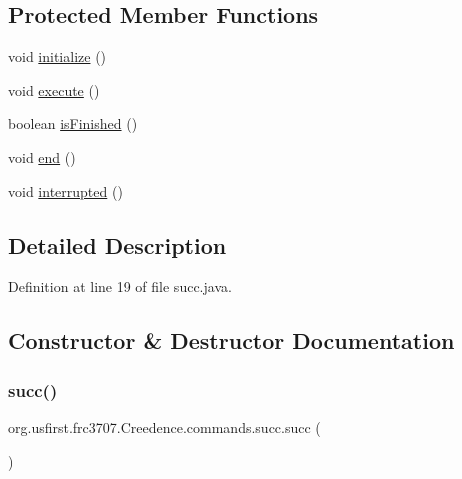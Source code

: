 \subsection*{Protected Member Functions}
\begin{DoxyCompactItemize}
\item 
void \mbox{\hyperlink{classorg_1_1usfirst_1_1frc3707_1_1_creedence_1_1commands_1_1succ_abf8eb585f450ad378004966b519ce842}{initialize}} ()
\item 
void \mbox{\hyperlink{classorg_1_1usfirst_1_1frc3707_1_1_creedence_1_1commands_1_1succ_ab8ef83e7b925286347a8119d844e157b}{execute}} ()
\item 
boolean \mbox{\hyperlink{classorg_1_1usfirst_1_1frc3707_1_1_creedence_1_1commands_1_1succ_a7415d180f380295eb9372b66a5e15e98}{is\+Finished}} ()
\item 
void \mbox{\hyperlink{classorg_1_1usfirst_1_1frc3707_1_1_creedence_1_1commands_1_1succ_af7bca51994950375ab3bb9032c836858}{end}} ()
\item 
void \mbox{\hyperlink{classorg_1_1usfirst_1_1frc3707_1_1_creedence_1_1commands_1_1succ_a07bba1af1394834921b0cb3403a843f6}{interrupted}} ()
\end{DoxyCompactItemize}


\subsection{Detailed Description}


Definition at line 19 of file succ.\+java.



\subsection{Constructor \& Destructor Documentation}
\mbox{\label{classorg_1_1usfirst_1_1frc3707_1_1_creedence_1_1commands_1_1succ_a7dd5842a1203577ab6f5eda380b67cae}} 
\subsubsection{\texorpdfstring{succ()}{succ()}}
{\footnotesize\ttfamily org.\+usfirst.\+frc3707.\+Creedence.\+commands.\+succ.\+succ (\begin{DoxyParamCaption}{ }\end{DoxyParamCaption})}



